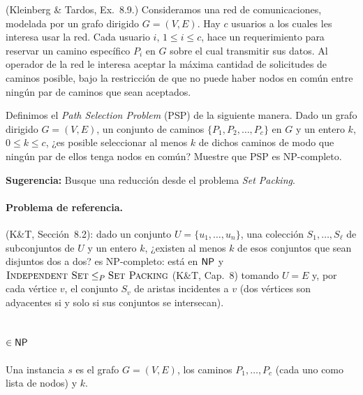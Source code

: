 \begin{enunciado}
(Kleinberg \& Tardos, Ex.~8.9.) Consideramos una red de comunicaciones, modelada por un grafo dirigido
$G=(V,E)$. Hay $c$ usuarios a los cuales les interesa usar la red. Cada usuario $i$, $1\le i\le c$, hace un
requerimiento para reservar un camino específico $P_i$ en $G$ sobre el cual transmitir sus datos. Al operador
de la red le interesa aceptar la máxima cantidad de solicitudes de caminos posible, bajo la restricción de
que no puede haber nodos en común entre ningún par de caminos que sean aceptados.

Definimos el \emph{Path Selection Problem} (PSP) de la siguiente manera. Dado un grafo dirigido $G=(V,E)$, un
conjunto de caminos $\{P_1,P_2,\dots,P_c\}$ en $G$ y un entero $k$, $0\le k\le c$, ¿es posible seleccionar al
menos $k$ de dichos caminos de modo que ningún par de ellos tenga nodos en común? Muestre que PSP es
NP-completo.

\textbf{Sugerencia:} Busque una reducción desde el problema \emph{Set Packing}.
\end{enunciado}


\paragraph{Problema de referencia.} \SP{} (K\&T, Sección~8.2): dado un conjunto $U=\{u_1,\dots,u_n\}$, una
colección $S_1,\dots,S_\ell$ de subconjuntos de $U$ y un entero $k$, ¿existen al menos $k$ de esos conjuntos
que sean disjuntos dos a dos? \SP{} es NP-completo: está en $\mathsf{NP}$ y $\textsc{Independent Set}\le_P\textsc{Set Packing}$ (K\&T, Cap.~8) tomando
$U=E$ y, por cada vértice $v$, el conjunto $S_v$ de aristas incidentes a $v$ (dos vértices son adyacentes si y
solo si sus conjuntos se intersecan).

\subsection*{\PSP{} $\in\mathsf{NP}$}

Una instancia $s$ es el grafo $G=(V,E)$, los caminos $P_1,\dots,P_c$ (cada uno como lista de nodos) y $k$.

